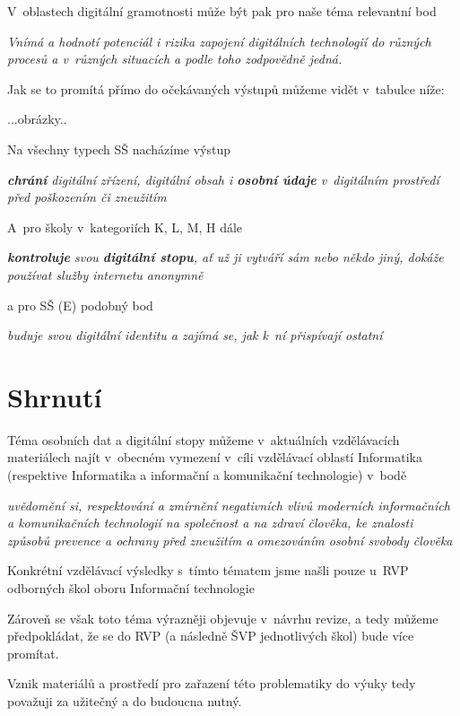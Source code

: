 V~oblastech digitální gramotnosti může být pak pro naše téma relevantní bod

\textit{Vnímá a hodnotí potenciál i rizika zapojení digitálních technologií do různých procesů a v různých situacích a podle toho zodpovědně jedná.}

Jak se to promítá přímo do očekávaných výstupů můžeme vidět v~tabulce níže:

...obrázky..

Na všechny typech SŠ nacházíme výstup

\textit{\textbf{chrání} digitální zřízení, digitální obsah i \textbf{osobní údaje} v~digitálním prostředí před poškozením či zneužitím}

A~pro školy v~kategoriích K, L, M, H dále

\textit{\textbf{kontroluje} svou \textbf{digitální stopu}, ať už ji vytváří sám nebo někdo jiný, dokáže používat služby internetu anonymně}

a pro SŠ (E) podobný bod

\textit{buduje svou digitální identitu a zajímá se, jak k~ní přispívají ostatní}

\section{Shrnutí}

Téma osobních dat a digitální stopy můžeme v~aktuálních vzdělávacích materiálech najít v~obecném vymezení v~cíli vzdělávací oblastí Informatika (respektive Informatika a informační a komunikační technologie) v~bodě

\textit{uvědomění si, respektování a zmírnění negativních vlivů moderních informačních a komunikačních technologií na společnost a na zdraví člověka, ke znalosti způsobů prevence a ochrany před zneužitím a omezováním osobní svobody člověka}

Konkrétní vzdělávací výsledky s~tímto tématem jsme našli pouze u~RVP odborných škol oboru Informační technologie

Zároveň se však toto téma výrazněji objevuje v~návrhu revize, a tedy můžeme předpokládat, že se do RVP (a následně ŠVP jednotlivých škol) bude více promítat.

Vznik materiálů a prostředí pro zařazení této problematiky do výuky tedy považuji za užitečný a do budoucna nutný.